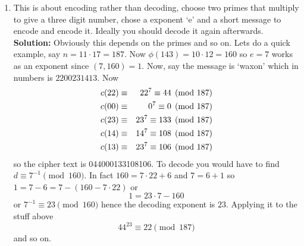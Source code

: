 \documentclass[12pt]{article}
\begin{document}
\begin{enumerate}
\item This is about encoding rather than decoding, choose two primes
  that multiply to give a three digit number, chose a exponent
  \lq{}e\rq{} and a short message to encode and encode it. Ideally you should decode it again afterwards.
\textbf{Solution: } Obviously this depends on the primes and so on. Lets do a quick example, say $n=11\cdot 17=187$. Now $\phi(143)=10\cdot 12=160$ so $e=7$ works as an exponent since $(7,160)=1$. Now, say the message is \lq{}waxon\rq{} which in numbers is $2200231413$. Now
\begin{eqnarray}
c(22)&\equiv& 22^{7}\equiv 44 \pmod{187}\cr
c(00)&\equiv& 0^{7}\equiv 0 \pmod{187}\cr
c(23)&\equiv& 23^{7}\equiv 133 \pmod{187}\cr
c(14)&\equiv& 14^{7}\equiv 108 \pmod{187}\cr
c(13)&\equiv& 23^{7}\equiv 106 \pmod{187}
\end{eqnarray}
so the cipher text is 044000133108106. To decode you would have to find $d\equiv 7^{-1}\pmod{160}$. In fact $160=7\cdot 22+6$ and $7=6+1$ so $1=7-6=7-(160-7\cdot 22)$ or
\begin{equation}
1=23\cdot 7-160
\end{equation}
or $7^{-1}\equiv 23\pmod{160}$ hence the decoding exponent is $23$. Applying it to the stuff above
\begin{equation}
44^{23}\equiv 22 \pmod{187}
\end{equation}
and so on.  
\end{enumerate}
\end{document}
